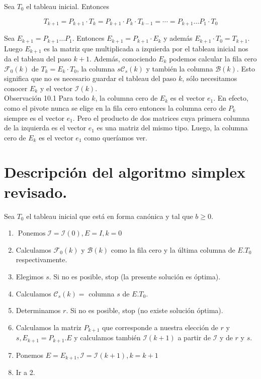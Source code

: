 \documentclass[10pt]{article}
\begin{document}
Sea $T_{0}$ el tableau inicial. Entonces

$$
T_{k+1}=P_{k+1} \cdot T_{k}=P_{k+1} \cdot P_{k} \cdot T_{k-1}=\cdots=P_{k+1} \ldots P_{1} \cdot T_{0}
$$

Sea $E_{k+1}=P_{k+1} \ldots P_{1}$. Entonces $E_{k+1}=P_{k+1} \cdot E_{k}$ y además $E_{k+1} \cdot T_{0}=T_{k+1}$. Luego $E_{k+1}$ es la matriz que multiplicada a izquierda por el tableau inicial nos da el tableau del paso $k+1$. Además, conociendo $E_{k}$ podemos calcular la fila cero $\mathcal{F}_{0}(k)$ de $T_{k}=E_{k} \cdot T_{0}$, la columna $s \mathcal{C}_{s}(k)$ y también la columna $\mathcal{B}(k)$. Esto significa que no es necesario guardar el tableau del paso $k$, sólo necesitamos conocer $E_{k}$ y el vector $\mathcal{I}(k)$.\\
Observación 10.1 Para todo $k$, la columna cero de $E_{k}$ es el vector $e_{1}$. En efecto, como el pivote nunca se elige en la fila cero entonces la columna cero de $P_{k}$ siempre es el vector $e_{1}$. Pero el producto de dos matrices cuya primera columna de la izquierda es el vector $e_{1}$ es una matriz del mismo tipo. Luego, la columna cero de $E_{k}$ es el vector $e_{1}$ como queríamos ver.

\section*{Descripción del algoritmo simplex revisado.}
Sea $T_{0}$ el tableau inicial que está en forma canónica y tal que $b \geq 0$.

\begin{enumerate}
  \item $\operatorname{Ponemos} \mathcal{I}=\mathcal{I}(0), E=I, k=0$
  \item Calculamos $\mathcal{F}_{0}(k)$ y $\mathcal{B}(k)$ como la fila cero y la última columna de $E . T_{0}$ respectivamente.
  \item Elegimos $s$. Si no es posible, stop (la presente solución es óptima).
  \item Calculamos $\mathcal{C}_{s}(k)=$ columna $s$ de $E . T_{0}$.
  \item Determinamos $r$. Si no es posible, stop (no existe solución óptima).
  \item Calculamos la matriz $P_{k+1}$ que corresponde a nuestra elección de $r$ y $s, E_{k+1}=P_{k+1} . E$ y calculamos también $\mathcal{I}(k+1)$ a partir de $\mathcal{I}$ y de $r$ y $s$.
  \item Ponemos $E=E_{k+1}, \mathcal{I}=\mathcal{I}(k+1), k=k+1$
  \item Ir a 2.
\end{enumerate}
\end{document}
